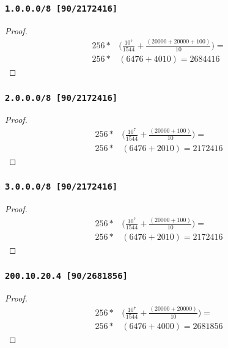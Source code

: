 \documentclass[12pt, times]{simauth}
\begin{document}
\begin{minipage}[t]{0.45\linewidth}
\subsubsection{\texttt{1.0.0.0/8 [90/2172416]}}
\begin{proof}
    \begin{align*}
        256 *& \bigg(\frac{10^7}{1544} + \frac{(20000 + 20000 + 100)}{10}\bigg) = \\
        256 *& (6476 + 4010) = 2684416
    \end{align*}
\end{proof}
\subsubsection{\texttt{2.0.0.0/8 [90/2172416]}}
\begin{proof}
\begin{align*}
256 *& \bigg(\frac{10^7}{1544} + \frac{(20000 + 100)}{10}\bigg) = \\
256 *& (6476 + 2010) = 2172416
\end{align*}
\end{proof}
\end{minipage} \hfill
\begin{minipage}[t]{0.45\linewidth}  
\subsubsection{\texttt{3.0.0.0/8 [90/2172416]}}
\begin{proof}
    \begin{align*}
        256 *& \bigg(\frac{10^7}{1544} + \frac{(20000 + 100)}{10}\bigg) = \\
        256 *& (6476 + 2010) = 2172416
    \end{align*}
\end{proof}
\subsubsection{\texttt{200.10.20.4 [90/2681856]}}
\begin{proof}
\begin{align*}
256 *& \bigg(\frac{10^7}{1544} + \frac{(20000 + 20000)}{10}\bigg) = \\
256 *& (6476 + 4000) = 2681856
\end{align*}
\end{proof}

\end{minipage}
\end{document}
